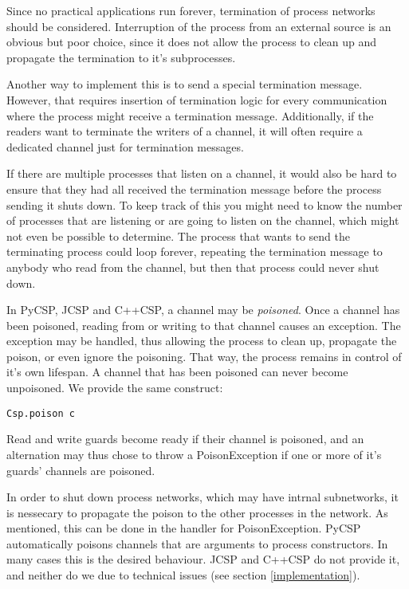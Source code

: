 \documentclass[a4paper,12pt]{article}
\begin{document}
Since no practical applications run forever, termination of process networks should be considered.
Interruption of the process from an external source is an obvious but poor choice, since it does not
allow the process to clean up and propagate the termination to it's subprocesses.

Another way to implement this is to send a special termination message. However, that requires 
insertion of termination logic for every communication where the process might receive a termination 
message. Additionally, if the readers want to terminate the writers of a channel, it will often 
require a dedicated channel just for termination messages.

If there are multiple processes that listen on a channel, it would also be hard to ensure that they had
all received the termination message before the process sending it shuts down. To keep track of this you
might need to know the number of processes that are listening or are going to listen on the channel, 
which might not even be possible to determine. The process that wants to send the terminating process 
could loop forever, repeating the termination message to anybody who read from the channel, but then 
that process could never shut down.

In PyCSP, JCSP and C++CSP, a channel may be \emph{poisoned}. Once a channel has been poisoned, reading
from or writing to that channel causes an exception. The exception may be handled, thus allowing the
process to clean up, propagate the poison, or even ignore the poisoning. That way, the process remains
in control of it's own lifespan. A channel that has been poisoned can never become unpoisoned.
We provide the same construct:

\begin{verbatim}
Csp.poison c 
\end{verbatim}

Read and write guards become ready if their channel is poisoned, and an alternation may thus chose to 
throw a PoisonException if one or more of it's guards' channels are poisoned.

In order to shut down process networks, which may have intrnal subnetworks, it is nessecary to propagate
the poison to the other processes in the network. As mentioned, this can be done in the handler for
PoisonException. PyCSP automatically poisons channels that are arguments to process constructors. In 
many cases this is the desired behaviour. JCSP and C++CSP do not provide it, and neither do we due to
technical issues (see section \ref{implementation}).
\end{document}
